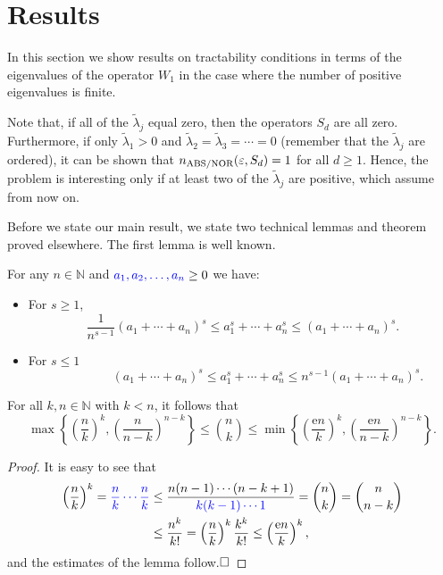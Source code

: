 \documentclass[graybox]{svmult}
\newcommand{\tlambda}{\widetilde{\lambda}}
\newcommand{\me}{\mathrm{e}}
\newcommand{\NOR}{\textup{NOR}\xspace}
\newcommand{\ABS}{\textup{ABS}\xspace}
\newcommand{\N}{{\mathbb{N}}} %
\newcommand{\pk}[1]{{\color{blue}{#1}}}
\begin{document}
\section{Results}
\label{sec:results}
 
In this section we show results on tractability conditions in terms of the eigenvalues of the 
operator $W_1$ in the case where the number of positive eigenvalues is finite. 

Note that, if all of the $\tlambda_j$ equal zero, then the operators $S_d$ are all zero. Furthermore, 
if only $\tlambda_1>0$ and $\tlambda_2=\tlambda_3=\cdots =0$ (remember that the $\tlambda_j$ are ordered), 
it can be shown that $n_{\ABS/\NOR}(\varepsilon,S_d)=1$ for all $d\ge 1$. Hence, the problem is 
interesting only if at least two of the $\tlambda_j$ are positive, which \pk{we} assume from now 
on. 

Before we state our main result, we state two technical lemmas and \pk{a} theorem proved elsewhere.  The first lemma is well known.

\begin{lemma} \label{sSumLem}
For any $n \in \N$  and $\pk{a_1,a_2,\ldots,a_n} \ge 0$ we have:
\begin{itemize}
\item For $s\ge1$,
\begin{equation*}
\frac1{n^{s-1}} (a_1 + \cdots + a_n)^s
\le a_1^s + \cdots + a_n^s \le
(a_1 + \cdots + a_n)^s.
\end{equation*}
\item For $s\le1$
\begin{equation*}
\qquad
\qquad
(a_1 + \cdots + a_n)^s
\le a_1^s + \cdots + a_n^s \le n^{s-1}(a_1 + \cdots + a_n)^s.
\end{equation*}
\end{itemize}
\end{lemma}


\begin{lemma} \label{binomBdLem} For all $k, n \in \N$ with $k < n$, it follows that
\begin{equation*}
      \max\left\{\left(\frac nk\right)^k,  \left(\frac n{n-k}\right)^{n-k} \right\}
      \le \binom{n}{k} \le \min\left\{\left(\frac {\me n}k\right)^k,  \left(\frac {\me n}{n-k}\right)^{n-k} \right\}.
\end{equation*}
\end{lemma}
\begin{proof}
It is easy to see that
                \begin{align*}
                \left(\frac nk\right)^k  = \pk{\frac{n}{k}\cdots\frac{n}{k}}           
                & \le \frac{n (n-1) \cdots (n - k+1)}{\pk{k (k-1) \cdots  1}}
                 =\binom{n}{k} = \binom{n}{n-k} \\
                & \le \frac{n^k}{k!} = \left(\frac nk\right)^k \frac{k^k}{k!} \le  \left(\frac {\me n}k\right)^k,
                \end{align*}
and the estimates of the lemma follow.$\hfill\Box$
\end{proof}
\end{document}
